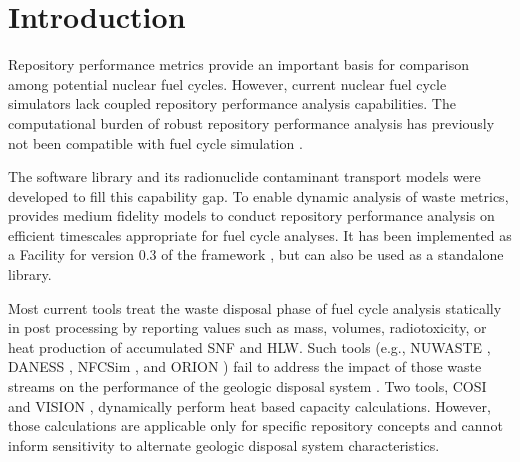 \section{Introduction}\label{sec:introduction}
Repository performance metrics provide an important basis for comparison among 
potential nuclear fuel cycles. However, current nuclear fuel cycle simulators 
lack coupled repository performance analysis capabilities.  The computational 
burden of robust repository performance analysis has previously not been 
compatible with fuel cycle simulation \cite{huff_functions_2011}.

The \Cyder software library \cite{huff_cyder_2013} and its radionuclide 
contaminant transport models were  developed to fill this capability gap.  To 
enable dynamic analysis of waste metrics, \Cyder provides medium fidelity 
models to conduct repository performance analysis on efficient timescales 
appropriate for fuel cycle analyses. It has been implemented as a Facility 
for version 0.3 of the \Cyclus framework \cite{wilson_cyclus_2013}, but can 
also be used as a standalone library.


Most current tools treat the waste disposal
phase of fuel cycle analysis statically in post processing by reporting
values such as mass, volumes, radiotoxicity, or heat production of accumulated
\gls{SNF} and \gls{HLW}. Such tools
(e.g.,
\gls{NUWASTE} \cite{abkowitz_nuclear_2010},
\gls{DANESS} \cite{van_den_durpel_daness:_2006},
\gls{NFCSim} \cite{schneider_nfcsim_2004}, and
ORION \cite{gregg_orion_2011})
fail to address the impact of those waste streams on the performance of the
geologic disposal system \cite{wilson_comparing_2011}.  Two tools, \gls{COSI}
\cite{boucher_international_2010} and \gls{VISION} \cite{yacout_vision_2006,
wilson_comparing_2011, radel_repository_2007, boucher_international_2010},
dynamically perform heat based capacity calculations.
However, those calculations are applicable only for specific
repository concepts and cannot inform sensitivity to alternate geologic disposal
system characteristics.
